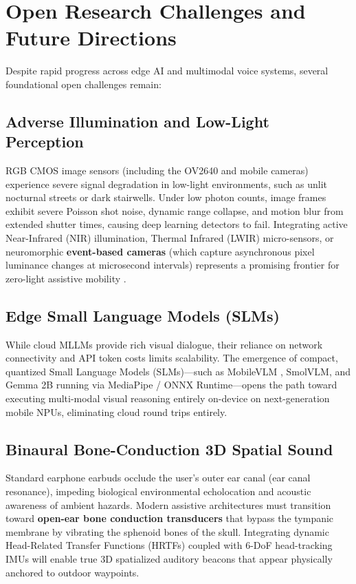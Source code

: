 \documentclass[10pt,twocolumn]{article}
\begin{document}
\section{Open Research Challenges and Future Directions}
\label{sec:challenges}

Despite rapid progress across edge AI and multimodal voice systems, several foundational open challenges remain:

\subsection{Adverse Illumination and Low-Light Perception}
RGB CMOS image sensors (including the OV2640 and mobile cameras) experience severe signal degradation in low-light environments, such as unlit nocturnal streets or dark stairwells. Under low photon counts, image frames exhibit severe Poisson shot noise, dynamic range collapse, and motion blur from extended shutter times, causing deep learning detectors to fail. Integrating active Near-Infrared (NIR) illumination, Thermal Infrared (LWIR) micro-sensors, or neuromorphic \textbf{event-based cameras} (which capture asynchronous pixel luminance changes at microsecond intervals) represents a promising frontier for zero-light assistive mobility \cite{gallego2020event}.

\subsection{Edge Small Language Models (SLMs)}
While cloud MLLMs provide rich visual dialogue, their reliance on network connectivity and API token costs limits scalability. The emergence of compact, quantized Small Language Models (SLMs)---such as MobileVLM \cite{yin2024mobilevlm}, SmolVLM, and Gemma 2B running via MediaPipe / ONNX Runtime---opens the path toward executing multi-modal visual reasoning entirely on-device on next-generation mobile NPUs, eliminating cloud round trips entirely.

\subsection{Binaural Bone-Conduction 3D Spatial Sound}
Standard earphone earbuds occlude the user's outer ear canal (ear canal resonance), impeding biological environmental echolocation and acoustic awareness of ambient hazards. Modern assistive architectures must transition toward \textbf{open-ear bone conduction transducers} that bypass the tympanic membrane by vibrating the sphenoid bones of the skull. Integrating dynamic Head-Related Transfer Functions (HRTFs) coupled with 6-DoF head-tracking IMUs will enable true 3D spatialized auditory beacons that appear physically anchored to outdoor waypoints.
\end{document}

